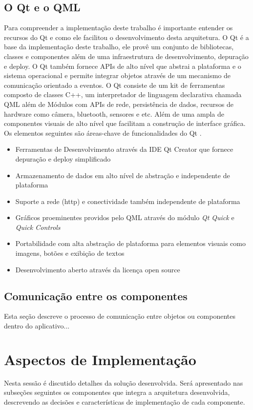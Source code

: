 \subsection{O Qt e o QML}\label{sec:solucao-desenvolvida}
Para compreender a implementação deste trabalho é importante entender os recursos do Qt e como ele facilitou o desenvolvimento desta arquitetura. O Qt é a base da implementação deste trabalho, ele provê um conjunto de bibliotecas, classes e componentes além de uma infraestrutura de desenvolvimento, depuração e deploy. O Qt também fornece APIs de alto nível que abstrai a plataforma e o sistema operacional e permite integrar objetos através de um mecanismo de comunicação orientado a eventos. O Qt consiste de um kit de ferramentas composto de classes C++, um interpretador de linguagem declarativa chamada QML além de Módulos com APIs de rede, persistência de dados, recursos de hardware como câmera, bluetooth, sensores e etc. Além de uma ampla de componentes visuais de alto nível que facilitam a construção de interface gráfica. Os elementos seguintes são áreas-chave de funcionalidades do Qt \cite{qt_overviews}.

\begin{itemize}
	\item Ferramentas de Desenvolvimento através da IDE Qt Creator que fornece depuração e deploy simplificado
	\item Armazenamento de dados em alto nível de abstração e independente de plataforma
	\item Suporte a rede (http) e conectividade também independente de plataforma
	\item Gráficos proeminentes providos pelo QML através do módulo \textit{Qt Quick} e \textit{Quick Controls}
	\item Portabilidade com alta abstração de plataforma para elementos visuais como imagens, botões e exibição de textos
	\item Desenvolvimento aberto através da licença open source
\end{itemize}

\subsection{Comunicação entre os componentes}
Esta seção descreve o processo de comunicação entre objetos ou componentes dentro do aplicativo...


\section{Aspectos de Implementação}\label{sec:solucao-desenvolvida}
Nesta sessão é discutido detalhes da solução desenvolvida. Será apresentado nas subseções seguintes os componentes que integra a arquitetura desenvolvida, descrevendo as decisões e características de implementação de cada componente.


